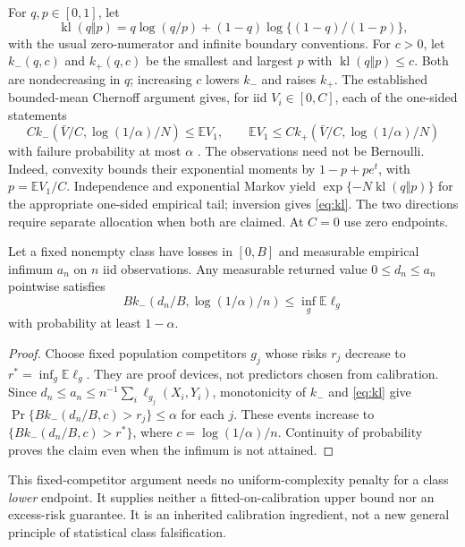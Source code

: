 For $q,p\in[0,1]$, let
\[
 \operatorname{kl}(q\Vert p)
 =q\log(q/p)+(1-q)\log\{(1-q)/(1-p)\},
\]
with the usual zero-numerator and infinite boundary conventions.
For $c>0$, let $k_-(q,c)$ and $k_+(q,c)$ be the smallest and largest
$p$ with $\operatorname{kl}(q\Vert p)\leq c$. Both are nondecreasing
in $q$; increasing $c$ lowers $k_-$ and raises $k_+$.
The established bounded-mean Chernoff argument gives, for iid
$V_i\in[0,C]$, each of the one-sided statements
\begin{equation}
 C k_-(\bar V/C,\log(1/\alpha)/N)\leq\mathbb E V_1,
 \qquad
 \mathbb E V_1\leq C k_+(\bar V/C,\log(1/\alpha)/N)
 \label{eq:kl}
\end{equation}
with failure probability at most $\alpha$ \citep{hoeffding1963}.
The observations need not be Bernoulli. Indeed, convexity bounds their
exponential moments by $1-p+pe^t$, with $p=\mathbb EV_1/C$.
Independence and exponential Markov yield
$\exp\{-N\operatorname{kl}(q\Vert p)\}$ for the appropriate one-sided
empirical tail; inversion gives \eqref{eq:kl}. The two directions require
separate allocation when both are claimed. At $C=0$ use zero endpoints.

\begin{proposition}
\label{prop:empirical}
Let a fixed nonempty class have losses in $[0,B]$ and measurable empirical
infimum $a_n$ on $n$ iid observations. Any measurable returned value
$0\leq d_n\leq a_n$ pointwise satisfies
\begin{equation}
 B k_-(d_n/B,\log(1/\alpha)/n)\leq
       \inf_g\mathbb E\ell_g
 \label{eq:empirical}
\end{equation}
with probability at least $1-\alpha$.
\end{proposition}

\begin{proof}
Choose fixed population competitors $g_j$ whose risks $r_j$ decrease to
$r^*=\inf_g\mathbb E\ell_g$. They are proof devices, not predictors
chosen from calibration. Since
$d_n\leq a_n\leq n^{-1}\sum_i\ell_{g_j}(X_i,Y_i)$, monotonicity of
$k_-$ and \eqref{eq:kl} give
$\Pr\{B k_-(d_n/B,c)>r_j\}\leq\alpha$ for each $j$.
These events increase to $\{B k_-(d_n/B,c)>r^*\}$, where
$c=\log(1/\alpha)/n$. Continuity of probability proves the claim even
when the infimum is not attained.
\end{proof}

This fixed-competitor argument needs no uniform-complexity penalty for a
class \emph{lower} endpoint. It supplies neither a fitted-on-calibration
upper bound nor an excess-risk guarantee. It is an inherited calibration
ingredient, not a new general principle of statistical class falsification.

